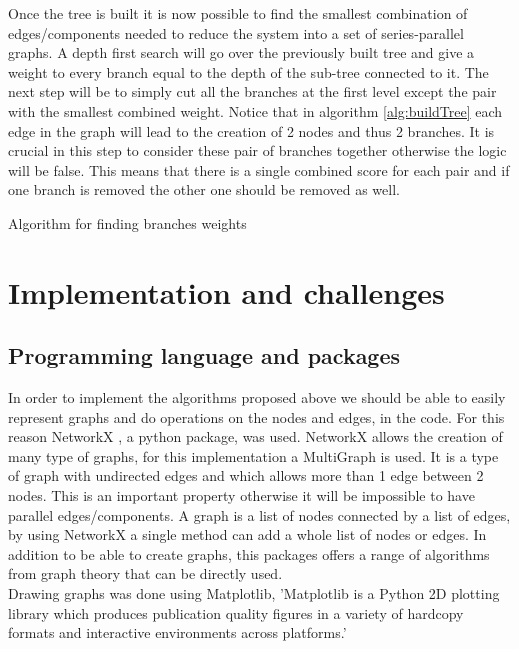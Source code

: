 \documentclass[conference]{IEEEtran}
\begin{document}
Once the tree is built it is now possible to find the smallest combination of
edges/components needed to reduce the system into a set of series-parallel
graphs. A depth first search will go over the previously built tree and give a
weight to every branch equal to the depth of the sub-tree connected to it. The
next  step will be to simply cut all the branches at the first level except the
pair with the smallest combined weight. Notice that in algorithm
\ref{alg:buildTree} each edge in the graph will lead to the creation of 2 nodes
and thus 2 branches. It is crucial in this step to consider these pair of
branches together otherwise the logic will be false. This means that there is a
single combined score for each pair and if one branch is removed the other one
should be removed as well.

\begin{algorithm}
\SetAlgoLined
{}

\BlankLine

\caption{Algorithm for finding branches weights}
\label{alg:addWeights}
\end{algorithm}

\section{Implementation and challenges}
\subsection{Programming language and packages}
In order to implement the algorithms proposed above we should be able to easily
represent graphs and do operations on the nodes and edges, in the code. For this
reason NetworkX \cite{networkx}, a python package, was used. NetworkX allows the
creation of many type of graphs, for this implementation a MultiGraph is used.
It is a type of graph with undirected edges and which allows more than 1 edge
between 2 nodes. This is an important property otherwise it will be impossible
to have parallel edges/components. A graph is a list of nodes connected by a
list of edges, by using NetworkX a single method can add a whole list of nodes
or edges. In addition to be able to create graphs, this packages offers a range
of algorithms from graph theory that can be directly used.\\
Drawing graphs was done using Matplotlib, 'Matplotlib is a Python 2D plotting
library which produces publication quality figures in a variety of hardcopy
formats and interactive environments across platforms.'\cite{matplotlib}
\end{document}

